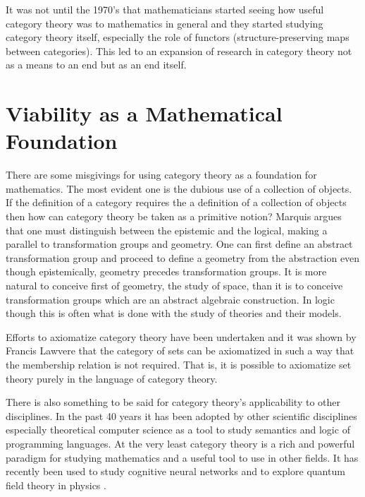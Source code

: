 \documentclass[11pt]{article}
\theoremstyle{definition}
\begin{document}
It was not until the 1970's that mathematicians started seeing how useful category theory was to mathematics in general and they started studying category theory itself, especially the role of functors (structure-preserving maps between categories).
This led to an expansion of research in category theory not as a means to an end but as an end itself. \cite{sep-category-theory}




\section{Viability as a Mathematical Foundation}
There are some misgivings for using category theory as a foundation for mathematics. The most evident one is the dubious use of a collection of objects.
If the definition of a category requires the a definition of a collection of objects then how can category theory be taken as a primitive notion?
Marquis \cite{MarquisJean-Pierre2009FaGP} argues that one must distinguish between the epistemic and the logical, making a parallel to transformation groups and geometry.
One can first define an abstract transformation group and proceed to define a geometry from the abstraction even though epistemically, geometry precedes transformation groups.
It is more natural to conceive first of geometry, the study of space, than it is to conceive transformation groups which are an abstract algebraic construction.
In logic though this is often what is done with the study of theories and their models. 


Efforts to axiomatize category theory have been undertaken and it was shown by Francis Lawvere that the category of sets can be axiomatized in such a way that the membership relation is not required. 
That is, it is possible to axiomatize set theory purely in the language of category theory. \cite{PeruzziA.2006Tmoc}


There is also something to be said for category theory's applicability to other disciplines.
In the past 40 years it has been adopted by other scientific disciplines especially theoretical computer science as a tool to study semantics and logic of programming languages. 
At the very least category theory is a rich and powerful paradigm for studying mathematics and a useful tool to use in other fields.
It has recently been used to study cognitive neural networks and to explore quantum field theory in physics \cite{sep-category-theory}.
\end{document}
